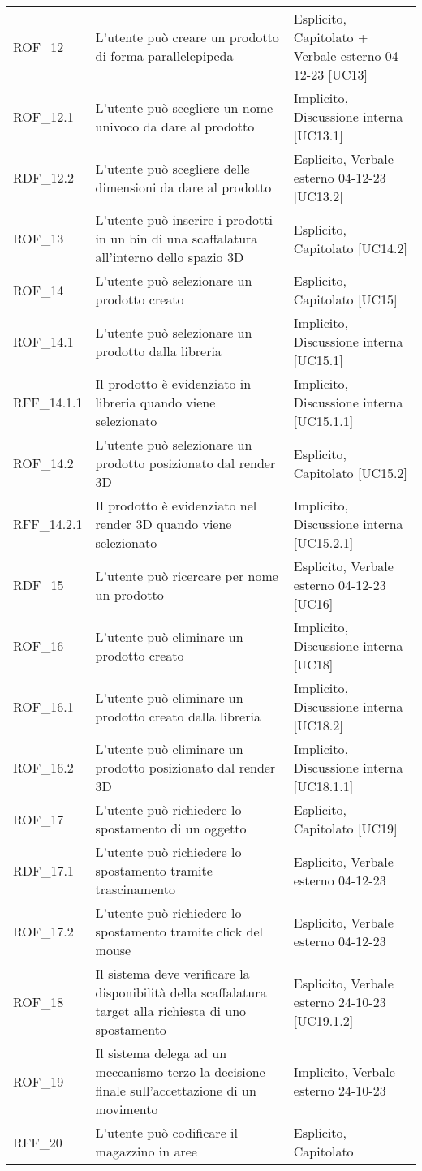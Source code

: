 \begin{xltabular}{\textwidth}{ p{0.1\textwidth} | X | p{0.3\textwidth} }
    ROF\_12 & L'utente può creare un prodotto di forma parallelepipeda & Esplicito, Capitolato + Verbale esterno 04-12-23 [UC13]\\
    ROF\_12.1 & L'utente può scegliere un nome univoco da dare al prodotto & Implicito, Discussione interna [UC13.1]\\
    RDF\_12.2 & L'utente può scegliere delle dimensioni da dare al prodotto & Esplicito, Verbale esterno 04-12-23 [UC13.2]\\    
    ROF\_13 & L'utente può inserire i prodotti in un bin di una scaffalatura all'interno dello spazio 3D & Esplicito, Capitolato [UC14.2]\\
    ROF\_14 & L'utente può selezionare un prodotto creato & Esplicito, Capitolato [UC15]\\
    ROF\_14.1 & L'utente può selezionare un prodotto dalla libreria & Implicito, Discussione interna [UC15.1]\\
    RFF\_14.1.1 & Il prodotto è evidenziato in libreria quando viene selezionato & Implicito, Discussione interna [UC15.1.1]\\
    ROF\_14.2 & L'utente può selezionare un prodotto posizionato dal render 3D & Esplicito, Capitolato [UC15.2]\\
    RFF\_14.2.1 & Il prodotto è evidenziato nel render 3D quando viene selezionato & Implicito, Discussione interna [UC15.2.1]\\
    RDF\_15 & L'utente può ricercare per nome un prodotto & Esplicito, Verbale esterno 04-12-23 [UC16]\\
    ROF\_16 & L'utente può eliminare un prodotto creato & Implicito, Discussione interna [UC18]\\
    ROF\_16.1 & L'utente può eliminare un prodotto creato dalla libreria & Implicito, Discussione interna [UC18.2]\\
    ROF\_16.2 & L'utente può eliminare un prodotto posizionato dal render 3D & Implicito, Discussione interna [UC18.1.1]\\
    ROF\_17 & L'utente può richiedere lo spostamento di un oggetto & Esplicito, Capitolato [UC19]\\
    RDF\_17.1 & L'utente può richiedere lo spostamento tramite trascinamento & Esplicito, Verbale esterno 04-12-23\\
    ROF\_17.2 & L'utente può richiedere lo spostamento tramite click del mouse & Esplicito, Verbale esterno 04-12-23\\
    ROF\_18 & Il sistema deve verificare la disponibilità della scaffalatura target alla richiesta di uno spostamento & Esplicito, Verbale esterno 24-10-23 [UC19.1.2]\\
    ROF\_19 & Il sistema delega ad un meccanismo terzo la decisione finale sull'accettazione di un movimento & Implicito, Verbale esterno 24-10-23\\
    RFF\_20 & L'utente può codificare il magazzino in aree & Esplicito, Capitolato \\
    \hline
\end{xltabular}


